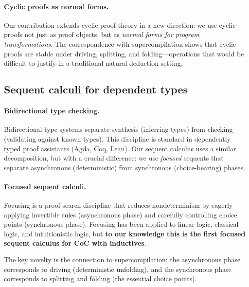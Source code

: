 \paragraph{Cyclic proofs as normal forms.}
Our contribution extends cyclic proof theory in a new direction: we use cyclic proofs not just as proof objects, but as \emph{normal forms for program transformations}.
The correspondence with supercompilation shows that cyclic proofs are stable under driving, splitting, and folding---operations that would be difficult to justify in a traditional natural deduction setting.

\subsection{Sequent calculi for dependent types}

\paragraph{Bidirectional type checking.}
Bidirectional type systems \cite{pierce-turner-2000-local-type-inference} separate synthesis (inferring types) from checking (validating against known types).
This discipline is standard in dependently typed proof assistants (Agda, Coq, Lean).
Our sequent calculus uses a similar decomposition, but with a crucial difference: we use \emph{focused} sequents that separate asynchronous (deterministic) from synchronous (choice-bearing) phases.

\paragraph{Focused sequent calculi.}
Focusing \cite{andreoli-1992-logic-programming,miller-2004-forum} is a proof search discipline that reduces nondeterminism by eagerly applying invertible rules (asynchronous phase) and carefully controlling choice points (synchronous phase).
Focusing has been applied to linear logic, classical logic, and intuitionistic logic, but \textbf{to our knowledge this is the first focused sequent calculus for CoC with inductives}.

The key novelty is the connection to supercompilation: the asynchronous phase corresponds to driving (deterministic unfolding), and the synchronous phase corresponds to splitting and folding (the essential choice points).

